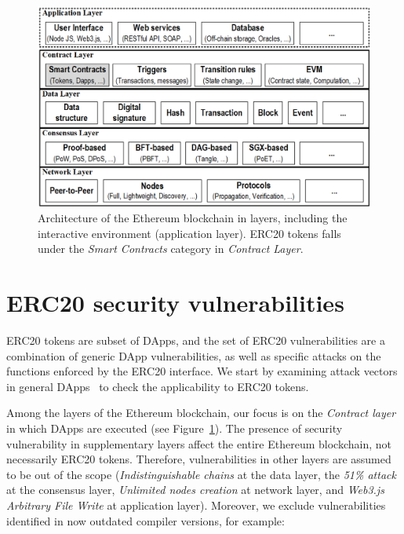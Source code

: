 
\begin{figure}[t!]
	\centering
	\includegraphics[width=1.0\linewidth]{figures/blockchain.png}
	\caption{Architecture of the Ethereum blockchain in layers, including the interactive environment (\ie application layer). ERC20 tokens falls under the \textit{Smart Contracts} category in \textit{Contract Layer}.}\label{fig:blockchain}
\end{figure}

\section{ERC20 security vulnerabilities}\label{sec:vul}
ERC20 tokens are subset of DApps, and the set of ERC20 vulnerabilities are a combination of generic DApp vulnerabilities, as well as specific attacks on the functions enforced by the ERC20 interface. We start by examining attack vectors in general DApps~\cite{SolidtySecBlog,EthSecServ,SoliditySecCon,ConsensysSecCon,LandoKL} to check the applicability to ERC20 tokens.

Among the layers of the Ethereum blockchain, our focus is on the \textit{Contract layer} in which DApps are executed (see Figure~\ref{fig:blockchain}). The presence of security vulnerability in supplementary layers affect the entire Ethereum blockchain, not necessarily ERC20 tokens. Therefore, vulnerabilities in other layers are assumed to be out of the scope (\eg \textit{Indistinguishable chains} at the data layer, the \textit{51\% attack} at the consensus layer, \textit{Unlimited nodes creation} at network layer, and \textit{Web3.js Arbitrary File Write} at application layer). Moreover, we exclude vulnerabilities identified in now outdated compiler versions, for example:

